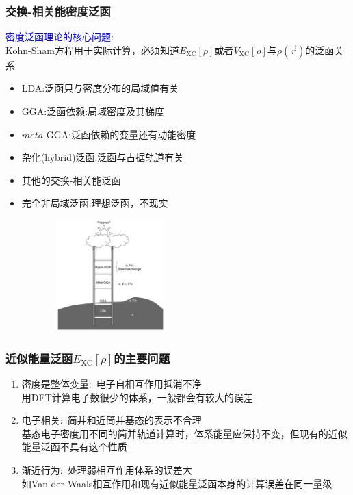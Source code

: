 \documentclass[cjk,slidestop,compress,mathserif,blue]{beamer}
\begin{document}
\frame                               %
{
\frametitle{交换-相关能密度泛函}
\textcolor{blue}{密度泛函理论的核心问题}:\\
\textrm{Kohn-Sham}方程用于实际计算，必须知道$E_{\mathrm{XC}}[\rho]$或者$V_{\mathrm{XC}}[\rho]$与$\rho(\vec r)$的泛函关系
\vskip 15pt
\begin{minipage}[b]{0.59\textwidth}
 \hspace*{-15pt}
 {\fontsize{7.5pt}{6.0pt}\selectfont\begin{itemize}%
	 \setlength{\itemsep}{10pt}
 \item \textrm{LDA}:泛函只与密度分布的局域值有关
 \item \textrm{GGA}:泛函依赖:局域密度及其梯度
 \item $meta$-\textrm{GGA}:泛函依赖的变量还有动能密度
 \item 杂化(\textrm{hybrid})泛函:泛函与占据轨道有关
 \item 其他的交换-相关能泛函
 \item<1-> 完全非局域泛函:理想泛函，不现实
 \end{itemize}}
\end{minipage}
\hfill
\begin{minipage}[b]{0.39\textwidth}
\hspace*{-10pt}
\includegraphics[height=1.7in,width=3.18in,viewport=10 5 1380 700,clip]{Figures/Jacobi-ladder.png}\\
\end{minipage}
}

\frame                               %
{
	\frametitle{近似能量泛函$E_{\mathrm{XC}}[\rho]$的主要问题}
\vskip 20pt
\begin{enumerate}%
   \setlength{\itemsep}{10pt}
 \item  密度是整体变量:~电子自相互作用抵消不净\\%
	 用\textrm{DFT}计算电子数很少的体系，一般都会有较大的误差
 \item  电子相关:~简并和近简并基态的表示不合理\\
	 基态电子密度用不同的简并轨道计算时，体系能量应保持不变，但现有的近似能量泛函不具有这个性质
 \item  渐近行为:~处理弱相互作用体系的误差大\\
	 如\textrm{Van der Waals}相互作用和现有近似能量泛函本身的计算误差在同一量级
 \end{enumerate}
}
\end{document}
